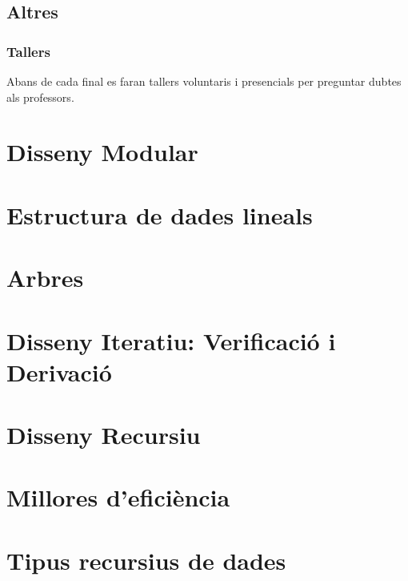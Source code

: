 \documentclass[12pt, a4paper, twoside]{report}
\begin{document}
\section*{Altres}
\subsection*{Tallers}
Abans de cada final es faran tallers voluntaris i presencials per preguntar dubtes als professors. 

\chapter{Disseny Modular}
\chapter{Estructura de dades lineals}
\chapter{Arbres}
\chapter{Disseny Iteratiu: Verificació i Derivació}
\chapter{Disseny Recursiu}
\chapter{Millores d'eficiència}
\chapter{Tipus recursius de dades}
\end{document}
